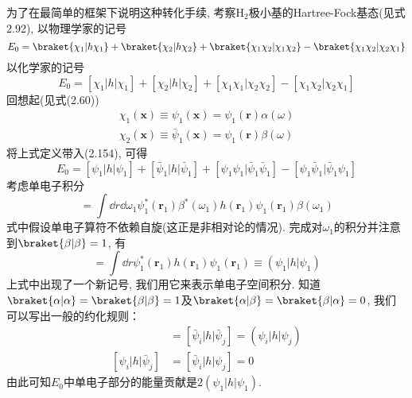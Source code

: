 为了在最简单的框架下说明这种转化手续, 
考察$\mathrm{H}_2$极小基的Hartree-Fock基态(见式2.92), 
以物理学家的记号
\begin{equation}
E_0 = \braket{\chi_1|h\chi_1} + \braket{\chi_2|h\chi_2} + \braket{\chi_1\chi_2|\chi_1\chi_2} - \braket{\chi_1\chi_2|\chi_2\chi_1}
\end{equation}
以化学家的记号
\begin{equation}
E_0 = [{\chi_1|h|\chi_1}] + [{\chi_2|h|\chi_2}] + [{\chi_1\chi_1|\chi_2\chi_2}] - [{\chi_1\chi_2|\chi_2\chi_1}]
\end{equation}
回想起(见式(2.60))
\begin{align}
\chi_1(\mathbf{x})\equiv \psi_1(\mathbf{x}) = \psi_1(\mathbf{\mathbf{r}})\alpha(\omega)\\
\chi_2(\mathbf{x})\equiv \bar{\psi}_1(\mathbf{x}) = \psi_1(\mathbf{\mathbf{r}})\beta(\omega)
\end{align}
将上式定义带入(2.154), 
可得
\begin{equation}
E_0 = [{\psi_1|h|\psi_1}] + [{\bar{\psi}_1|h|\bar{\psi}_1}] + [{\psi_1\psi_1|\bar{\psi}_1\bar{\psi}_1}] - [{\psi_1\bar{\psi}_1|\bar{\psi}_1\psi_1}]
\end{equation}
考虑单电子积分
\begin{equation}
[\bar{\psi}_1|h|\bar{\psi}_1] = \int\dd{r}\dd\omega_1\psi_1^*(\mathbf{r}_1)\beta^*(\omega_1)h(\mathbf{r}_1)\psi_1(\mathbf{r}_1)\beta(\omega_1)
\end{equation}
式中假设单电子算符不依赖自旋(这正是非相对论\ha 的情况). 
完成对$\omega_1$的积分并注意到$\braket{\beta|\beta}=1$, 
有
\begin{equation}
[\bar{\psi}_1|h|\bar{\psi}_1] =\int\dd{r}\psi_1^*(\mathbf{r}_1)h(\mathbf{r}_1)\psi_1(\mathbf{r}_1) \equiv (\psi_1|h|\psi_1)
\end{equation}
上式中出现了一个新记号, 
我们用它来表示单电子空间积分. 
知道$\braket{\alpha|\alpha}=\braket{\beta|\beta}=1$及$\braket{\alpha|\beta}=\braket{\beta|\alpha}=0$, 
我们可以写出一般的约化规则：
\begin{align}
[{\psi}_i|h|{\psi}_j] & = [\bar{\psi}_i|h|\bar{\psi}_j] = (\psi_i|h|\psi_j)\\
[{\psi}_i|h|\bar{\psi}_j] & = [\bar{\psi}_i|h|\psi_j] = 0 
\end{align}
由此可知$E_0$中单电子部分的能量贡献是$2(\psi_1|h|\psi_1)$.


